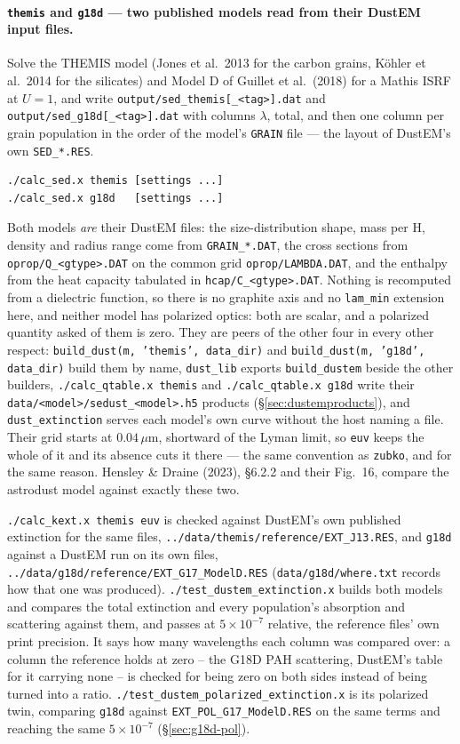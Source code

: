 \documentclass{my_memo}
\newcommand{\code}[1]{\texttt{#1}}
\newcommand{\um}{\ensuremath{\,\mu\mathrm{m}}}
\begin{document}
\paragraph{\code{themis} and \code{g18d} --- two published models read from
their DustEM input files.}\label{sec:standalone:dustem} Solve the THEMIS model
(Jones et al.\ 2013 for the carbon grains, K\"ohler et al.\ 2014 for the
silicates) and Model D of Guillet et al.\ (2018) for a Mathis ISRF at $U = 1$,
and write \code{output/sed\_themis[\_<tag>].dat} and
\code{output/sed\_g18d[\_<tag>].dat} with columns $\lambda$, total, and then
one column per grain population in the order of the model's \code{GRAIN} file
--- the layout of DustEM's own \code{SED\_*.RES}.
\begin{lstlisting}[style=sh]
./calc_sed.x themis [settings ...]
./calc_sed.x g18d   [settings ...]
\end{lstlisting}
\noindent Both models \emph{are} their DustEM files: the size-distribution
shape, mass per H, density and radius range come from \code{GRAIN\_*.DAT}, the
cross sections from \code{oprop/Q\_<gtype>.DAT} on the common grid
\code{oprop/LAMBDA.DAT}, and the enthalpy from the heat capacity tabulated in
\code{hcap/C\_<gtype>.DAT}. Nothing is recomputed from a dielectric function,
so there is no graphite axis and no \code{lam\_min} extension here, and neither
model has polarized optics: both are scalar, and a polarized quantity asked of
them is zero. They are peers of the other four in every other respect:
\code{build\_dust(m, 'themis', data\_dir)} and \code{build\_dust(m, 'g18d',
data\_dir)} build them by name, \code{dust\_lib} exports \code{build\_dustem}
beside the other builders, \code{./calc\_qtable.x themis} and
\code{./calc\_qtable.x g18d} write their
\code{data/<model>/sedust\_<model>.h5} products
(\S\ref{sec:dustemproducts}), and \code{dust\_extinction} serves each model's
own curve without the host naming a file. Their grid starts at $0.04$\um, shortward of the Lyman limit, so
\code{euv} keeps the whole of it and its absence cuts it there --- the same
convention as \code{zubko}, and for the same reason. Hensley \& Draine (2023),
\S6.2.2 and their Fig.~16, compare the astrodust model against exactly these
two.

\medskip
\noindent \code{./calc\_kext.x themis euv} is checked against DustEM's own
published extinction for the same files,
\code{../data/themis/reference/EXT\_J13.RES}, and \code{g18d} against a
DustEM run on its own files, \code{../data/g18d/reference/EXT\_G17\_ModelD.RES}
(\code{data/g18d/where.txt} records how that one was produced).
\code{./test\_dustem\_extinction.x} builds both models and compares the total
extinction and every population's absorption and scattering against them,
and passes at $5\times10^{-7}$ relative, the reference files' own print
precision.  It says how many wavelengths each column was compared over: a
column the reference holds at zero -- the G18D PAH scattering, DustEM's table
for it carrying none -- is checked for being zero on both sides instead of
being turned into a ratio.
\code{./test\_dustem\_polarized\_extinction.x} is its polarized twin, comparing
\code{g18d} against \code{EXT\_POL\_G17\_ModelD.RES} on the same terms and
reaching the same $5\times10^{-7}$ (\S\ref{sec:g18d-pol}).
\end{document}
